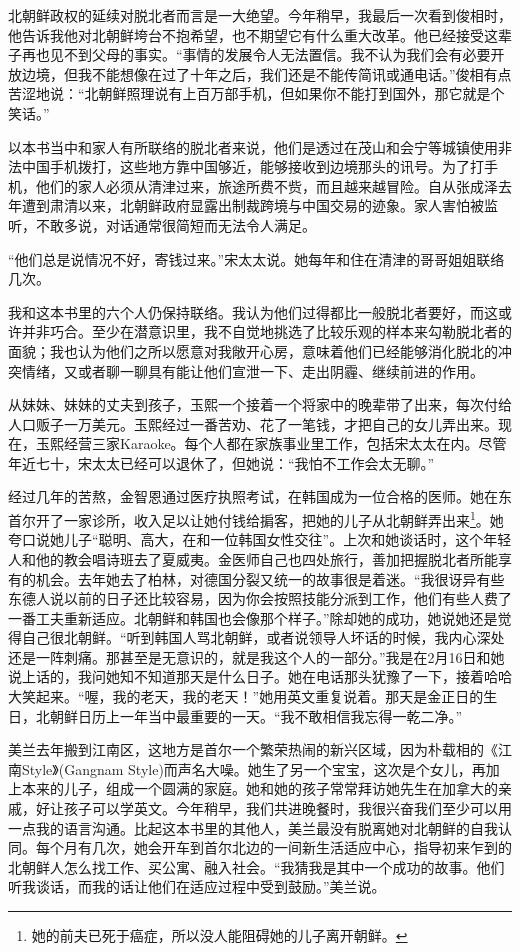 北朝鲜政权的延续对脱北者而言是一大绝望。今年稍早，我最后一次看到俊相时，他告诉我他对北朝鲜垮台不抱希望，也不期望它有什么重大改革。他已经接受这辈子再也见不到父母的事实。“事情的发展令人无法置信。我不认为我们会有必要开放边境，但我不能想像在过了十年之后，我们还是不能传简讯或通电话。”俊相有点苦涩地说：“北朝鲜照理说有上百万部手机，但如果你不能打到国外，那它就是个笑话。”

以本书当中和家人有所联络的脱北者来说，他们是透过在茂山和会宁等城镇使用非法中国手机拨打，这些地方靠中国够近，能够接收到边境那头的讯号。为了打手机，他们的家人必须从清津过来，旅途所费不赀，而且越来越冒险。自从张成泽去年遭到肃清以来，北朝鲜政府显露出制裁跨境与中国交易的迹象。家人害怕被监听，不敢多说，对话通常很简短而无法令人满足。

“他们总是说情况不好，寄钱过来。”宋太太说。她每年和住在清津的哥哥姐姐联络几次。

我和这本书里的六个人仍保持联络。我认为他们过得都比一般脱北者要好，而这或许并非巧合。至少在潜意识里，我不自觉地挑选了比较乐观的样本来勾勒脱北者的面貌；我也认为他们之所以愿意对我敞开心房，意味着他们已经能够消化脱北的冲突情绪，又或者聊一聊具有能让他们宣泄一下、走出阴霾、继续前进的作用。

从妹妹、妹妹的丈夫到孩子，玉熙一个接着一个将家中的晚辈带了出来，每次付给人口贩子一万美元。玉熙经过一番苦劝、花了一笔钱，才把自己的女儿弄出来。现在，玉熙经营三家Karaoke。每个人都在家族事业里工作，包括宋太太在内。尽管年近七十，宋太太已经可以退休了，但她说：“我怕不工作会太无聊。”

经过几年的苦熬，金智恩通过医疗执照考试，在韩国成为一位合格的医师。她在东首尔开了一家诊所，收入足以让她付钱给掮客，把她的儿子从北朝鲜弄出来\footnote{她的前夫已死于癌症，所以没人能阻碍她的儿子离开朝鲜。}。她夸口说她儿子“聪明、高大，在和一位韩国女性交往”。上次和她谈话时，这个年轻人和他的教会唱诗班去了夏威夷。金医师自己也四处旅行，善加把握脱北者所能享有的机会。去年她去了柏林，对德国分裂又统一的故事很是着迷。“我很讶异有些东德人说以前的日子还比较容易，因为你会按照技能分派到工作，他们有些人费了一番工夫重新适应。北朝鲜和韩国也会像那个样子。”除却她的成功，她说她还是觉得自己很北朝鲜。“听到韩国人骂北朝鲜，或者说领导人坏话的时候，我内心深处还是一阵刺痛。那甚至是无意识的，就是我这个人的一部分。”我是在2月16日和她说上话的，我问她知不知道那天是什么日子。她在电话那头犹豫了一下，接着哈哈大笑起来。“喔，我的老天，我的老天！”她用英文重复说着。那天是金正日的生日，北朝鲜日历上一年当中最重要的一天。“我不敢相信我忘得一乾二净。”

美兰去年搬到江南区，这地方是首尔一个繁荣热闹的新兴区域，因为朴载相的《江南Style》(Gangnam Style)而声名大噪。她生了另一个宝宝，这次是个女儿，再加上本来的儿子，组成一个圆满的家庭。她和她的孩子常常拜访她先生在加拿大的亲戚，好让孩子可以学英文。今年稍早，我们共进晚餐时，我很兴奋我们至少可以用一点我的语言沟通。比起这本书里的其他人，美兰最没有脱离她对北朝鲜的自我认同。每个月有几次，她会开车到首尔北边的一间新生活适应中心，指导初来乍到的北朝鲜人怎么找工作、买公寓、融入社会。“我猜我是其中一个成功的故事。他们听我谈话，而我的话让他们在适应过程中受到鼓励。”美兰说。


